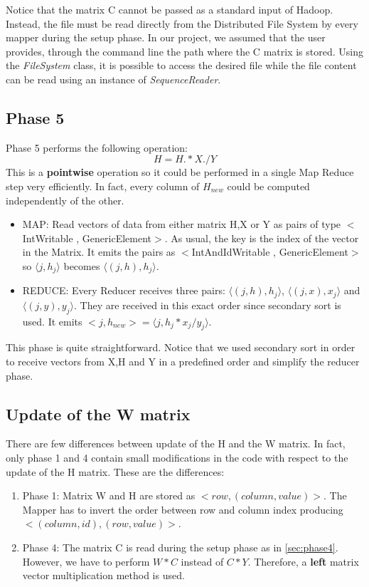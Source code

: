 \documentclass[a4paper,12pt]{article}
\newcommand{\CLASS}[1] {\textit{#1}}
\begin{document}
Notice that the matrix C cannot be passed as a standard input of Hadoop.
Instead, the file must be read directly from the Distributed File System by every mapper during the setup phase. 
In our project, we assumed that the user provides, through the command line the path where the C matrix is stored. 
Using the \CLASS{FileSystem} class, it is possible to access the desired file while the file content can be read using an instance of \CLASS{SequenceReader}.

\subsection{Phase 5}
\label{sec:phase5}

Phase 5 performs the following operation:
$$ H = H.*X./Y$$
This is a \textbf{pointwise} operation so it could be performed in a single Map Reduce step very efficiently.
In fact, every column of $H_{new}$ could be computed independently of the other.
\begin{itemize}

         \item MAP: Read vectors of data from either matrix H,X or Y as pairs of type $<$IntWritable , GenericElement$>$.
         As usual, the key is the index of the vector in the Matrix.
         It emits the pairs as $<$IntAndIdWritable , GenericElement$>$ so $\langle j, h_j \rangle$ becomes $\langle (j,h), h_j \rangle$.

          \item REDUCE: Every Reducer receives three pairs: $\langle (j,h), h_j \rangle$, $\langle (j,x), x_j \rangle$ and $\langle (j,y), y_j \rangle$. They are received in this exact order since secondary sort is used. It emits $<j,h_{new}> = \langle j, h_j*x_j/y_j \rangle$.

\end{itemize}

This phase is quite straightforward.
Notice that we used secondary sort in order to receive vectors from X,H and Y in a predefined order and simplify the reducer phase.

\subsection{Update of the W matrix}
\label{sec:Wphase}

There are few differences between update of the H and the W matrix.
In fact, only phase 1 and 4 contain small modifications in the code with respect to the update of the H matrix.
These are the differences:
\begin{enumerate}
\item Phase 1: Matrix W and H are stored as $<row, (column,value)>$. 
The Mapper has to invert the order between row and column index producing $<(column,id),(row,value)>$.
\item Phase 4: The matrix C is read during the setup phase as in \ref{sec:phase4}. 
However, we have to perform $W*C$ instead of $C*Y$.
Therefore, a \textbf{left} matrix vector multiplication method is used.
\end{enumerate}
\end{document}
